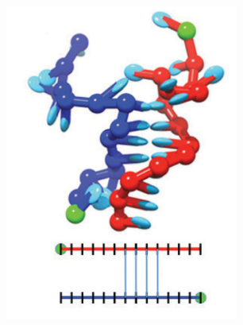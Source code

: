 \begin{figure}[ht]
\begin{centering}
\begin{subfigure}[t]{\dimexpr.15\linewidth-1.3em\relax}
  \includegraphics[width=1.1\linewidth,valign=t]{Figures/hybridDiag3.png}
  \end{subfigure}
  \hspace{-0.21cm}
  \begin{subfigure}[t]{\dimexpr.15\linewidth-1.3em\relax}
  \centering

\end{subfigure}
\end{centering}
\end{figure}

